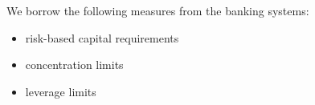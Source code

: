 \documentclass[english,11pt]{article}
\begin{document}
We borrow the following measures from the banking systems:
\begin{itemize}
\item risk-based capital requirements
\item concentration limits
\item leverage limits
\end{itemize}

\newpage


\end{document}
